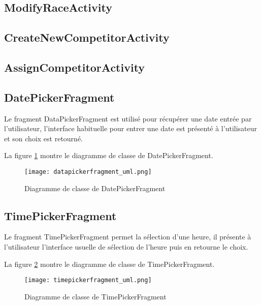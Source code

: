 
\subsection{ModifyRaceActivity}


\subsection{CreateNewCompetitorActivity}


\subsection{AssignCompetitorActivity}


\subsection{DatePickerFragment}

Le fragment DataPickerFragment est utilisé pour récupérer une date entrée par l'utilisateur, l'interface habituelle pour entrer une date est présenté à l'utilisateur et son choix est retourné.

La figure \ref{fig:datapickerfragment_uml} montre le diagramme de classe de DatePickerFragment.

\begin{figure}[htb]
\centering 
\texttt{[image: datapickerfragment\_uml.png]} 
\caption{Diagramme de classe de DatePickerFragment}
\label{fig:datapickerfragment_uml}
 \end{figure}


\subsection{TimePickerFragment}

Le fragment TimePickerFragment permet la sélection d'une heure, il présente à l'utilisateur l'interface usuelle de sélection de l'heure puis en retourne le choix.

La figure \ref{fig:timepickerfragment_uml} montre le diagramme de classe de TimePickerFragment.

\begin{figure}[htb]
\centering 
\texttt{[image: timepickerfragment\_uml.png]} 
\caption{Diagramme de classe de TimePickerFragment}
\label{fig:timepickerfragment_uml}
 \end{figure}

